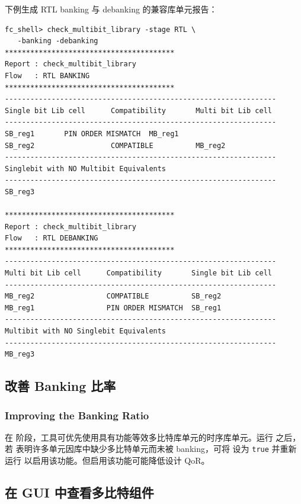 下例生成 RTL banking 与 debanking 的兼容库单元报告：
\begin{lstlisting}
fc_shell> check_multibit_library -stage RTL \
   -banking -debanking
****************************************
Report : check_multibit_library
Flow   : RTL BANKING
****************************************
----------------------------------------------------------------
Single bit Lib cell      Compatibility       Multi bit Lib cell
----------------------------------------------------------------
SB_reg1       PIN ORDER MISMATCH  MB_reg1
SB_reg2                  COMPATIBLE          MB_reg2
----------------------------------------------------------------
Singlebit with NO Multibit Equivalents
----------------------------------------------------------------
SB_reg3

****************************************
Report : check_multibit_library
Flow   : RTL DEBANKING
****************************************
----------------------------------------------------------------
Multi bit Lib cell      Compatibility       Single bit Lib cell
----------------------------------------------------------------
MB_reg2                 COMPATIBLE          SB_reg2
MB_reg1                 PIN ORDER MISMATCH  SB_reg1
----------------------------------------------------------------
Multibit with NO Singlebit Equivalents
----------------------------------------------------------------
MB_reg3
\end{lstlisting}

\subsection{改善 Banking 比率}
\subsubsection*{Improving the Banking Ratio}

在  阶段，工具可优先使用具有功能等效多比特库单元的时序库单元。运行  之后，若  表明许多单元因库中缺少多比特单元而未被 banking，可将  设为 \texttt{true} 并重新运行  以启用该功能。但启用该功能可能降低设计 QoR。

\subsection{在 GUI 中查看多比特组件}
